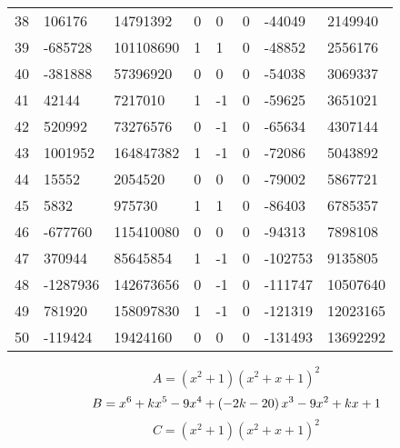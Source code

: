 \documentclass{amsart}
\begin{document}
\begin{longtable}{|l|l|l|lllll|}
38&106176&14791392&0&0&0&-44049&2149940\\
39&-685728&101108690&1&1&0&-48852&2556176\\
40&-381888&57396920&0&0&0&-54038&3069337\\
41&42144&7217010&1&-1&0&-59625&3651021\\
42&520992&73276576&0&-1&0&-65634&4307144\\
43&1001952&164847382&1&-1&0&-72086&5043892\\
44&15552&2054520&0&0&0&-79002&5867721\\
45&5832&975730&1&1&0&-86403&6785357\\
46&-677760&115410080&0&0&0&-94313&7898108\\
47&370944&85645854&1&-1&0&-102753&9135805\\
48&-1287936&142673656&0&-1&0&-111747&10507640\\
49&781920&158097830&1&-1&0&-121319&12023165\\
50&-119424&19424160&0&0&0&-131493&13692292\\
\hline
\end{longtable}
$$A=(x^2
 + 1)(x^2
 + x
 + 1)^{2}$$
$$B=x^6
 + k\*x^5
 - 9\*x^4
 + \left(-2\*k
 - 20\right) \*x^3
 - 9\*x^2
 + k\*x
 + 1$$
$$C=(x^2
 + 1)(x^2
 + x
 + 1)^{2}$$
\end{document}
